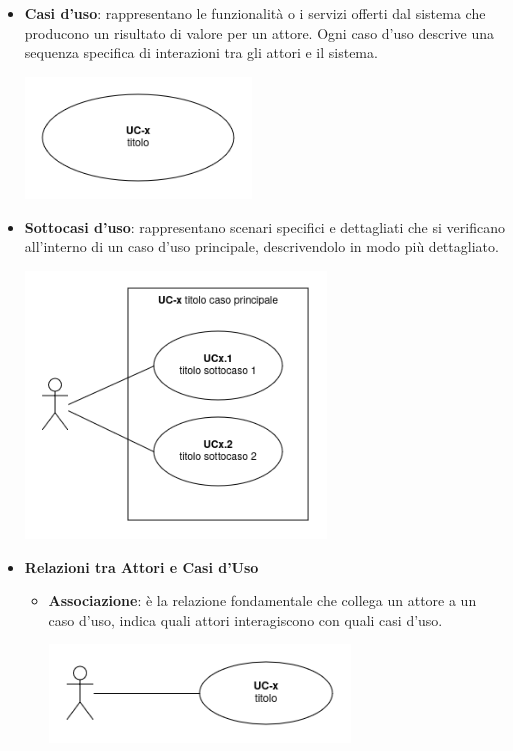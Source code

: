 \begin{itemize}
	\item \textbf{Casi d'uso}: rappresentano le funzionalità o i servizi offerti dal sistema che producono un risultato di valore per un attore. Ogni caso d'uso descrive una sequenza specifica di interazioni tra gli attori e il sistema.
	      \begin{center}
		      \includegraphics*[width=6cm]{../../../images/norme_di_progetto/uc.png}
	      \end{center}
	\item \textbf{Sottocasi d'uso}: rappresentano scenari specifici e dettagliati che si verificano all'interno di un caso d'uso principale, descrivendolo in modo più dettagliato.
	      \begin{center}
		      \includegraphics*[width=8cm]{../../../images/norme_di_progetto/sottocasi.png}
	      \end{center}

	\item \textbf{Relazioni tra Attori e Casi d'Uso}
	      \begin{itemize}
		      \item \textbf{Associazione}: è la relazione fondamentale che collega un attore a un caso d'uso, indica quali attori interagiscono con quali casi d'uso.
		            \begin{center}
			            \includegraphics*[width=8cm]{../../../images/norme_di_progetto/associazione.png}
		            \end{center}
	      \end{itemize}


\end{itemize}
